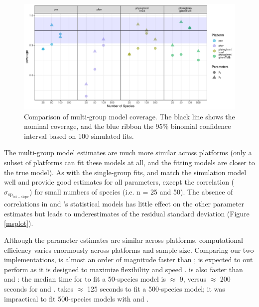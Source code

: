 \documentclass[12pt]{article}
\begin{document}
\begin{center}
\begin{figure}[H]
  \includegraphics[scale=0.7]{./figure/mscoverage.pdf}
  \caption{Comparison of multi-group model coverage. The black line shows the nominal coverage, and the blue ribbon the 95\% binomial confidence interval based on 100 simulated fits.}
  \label{msplot_coverage}
\end{figure}
\end{center}

The multi-group model estimates are much more similar across platforms (only a subset of platforms can fit these models at all, and the fitting models are closer to the true model).
As with the single-group fits,  and  match the simulation model well and provide good estimates for all parameters, except the correlation ($\sigma_{\mathrm{sp_{int-slope}}}$) for small numbers of species (i.e. n = 25 and 50).
The absence of correlations in  and 's statistical models has little effect on the other parameter estimates but leads to underestimates of the residual standard deviation (Figure \ref{msplot}).

Although the parameter estimates are similar across platforms, computational efficiency varies enormously across platforms and sample size.
Comparing our two implementations,  is almost an order of magnitude faster than ;  is expected to out perform  as it is designed to maximize flexibility and speed \citep{brooks2017glmmTMB}.
 is also faster than  and : the median time for  to fit a 50-species model is $\approx$ 9, versus $\approx$ 200 seconds for  and .
 takes $\approx$ 125 seconds to fit a 500-species model; it was impractical to fit 500-species models with  and .
\end{document}
